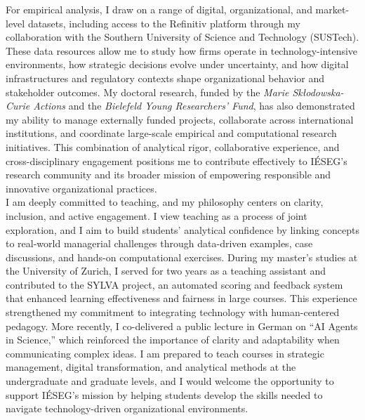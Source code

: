 \documentclass{nfr}
\begin{document}
For empirical analysis, I draw on a range of digital, organizational, and market-level datasets, including access to the Refinitiv platform through my collaboration with the Southern University of Science and Technology (SUSTech). 
These data resources allow me to study how firms operate in technology-intensive environments, how strategic decisions evolve under uncertainty, and how digital infrastructures and regulatory contexts shape organizational behavior and stakeholder outcomes. 
My doctoral research, funded by the \textit{Marie Skłodowska-Curie Actions} and the \textit{Bielefeld Young Researchers’ Fund}, has also demonstrated my ability to manage externally funded projects, collaborate across international institutions, and coordinate large-scale empirical and computational research initiatives. 
This combination of analytical rigor, collaborative experience, and cross-disciplinary engagement positions me to contribute effectively to IÉSEG’s research community and its broader mission of empowering responsible and innovative organizational practices.\\

I am deeply committed to teaching, and my philosophy centers on clarity, inclusion, and active engagement. 
I view teaching as a process of joint exploration, and I aim to build students’ analytical confidence by linking concepts to real-world managerial challenges through data-driven examples, case discussions, and hands-on computational exercises. 
During my master’s studies at the University of Zurich, I served for two years as a teaching assistant and contributed to the SYLVA project, an automated scoring and feedback system that enhanced learning effectiveness and fairness in large courses. 
This experience strengthened my commitment to integrating technology with human-centered pedagogy. 
More recently, I co-delivered a public lecture in German on “AI Agents in Science,” which reinforced the importance of clarity and adaptability when communicating complex ideas. 
I am prepared to teach courses in strategic management, digital transformation, and analytical methods at the undergraduate and graduate levels, and I would welcome the opportunity to support IÉSEG’s mission by helping students develop the skills needed to navigate technology-driven organizational environments.\\
\end{document}
